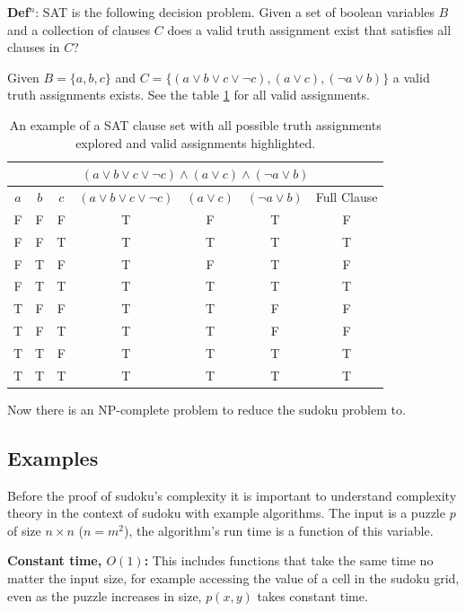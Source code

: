\documentclass[a4paper,11pt]{report}
\newcounter{row}
\newcounter{col}
\begin{document}
\textbf{Def$^n$}: SAT is the following decision problem. Given a set of boolean variables $B$ and a collection of clauses $C$ does a valid truth assignment exist that satisfies all clauses in $C$?

Given $B = \{a,b,c\}$ and  $C=\{(a\lor b \lor c \lor \neg c), (a \lor c), (\neg a\lor b)\}$ a valid truth assignments exists. See the table \ref{satex} for all valid assignments.

\begin{table}
\begin{center}
\begin{tabular}{ |c|c|c|c|c|c|c|  }
 \hline
 \multicolumn{7}{|c|}{$(a\lor b \lor c \lor \neg c)\land (a \lor c) \land (\neg a\lor b)$} \\
 \hline
$a$ & $b$ & $c$ & $(a\lor b \lor c \lor \neg c)$ & $(a \lor c)$ & $(\neg a\lor b)$ & Full Clause\\
 \hline
 F & F & F & T & F & T & F \\
\rowcolor{lightgray}
 F & F & T & T & T & T & T \\
 F & T & F & T & F & T & F \\
\rowcolor{lightgray}
 F & T & T & T & T & T & T \\
 T & F & F & T & T & F & F \\
 T & F & T & T & T & F & F \\
\rowcolor{lightgray}
 T & T & F & T & T & T & T \\
\rowcolor{lightgray}
 T & T & T & T & T & T & T \\
 \hline
\end{tabular}
\end{center}
\caption{\label{satex}An example of a SAT clause set with all possible truth assignments explored and valid assignments highlighted.}
\end{table}

Now there is an NP-complete problem to reduce the sudoku problem to.

\subsection{Examples}

Before the proof of sudoku's complexity it is important to understand complexity theory in the context of sudoku with example algorithms. The input is a puzzle $p$ of size $n\times n$ ($n=m^2$), the algorithm's run time is a function of this variable.

\textbf{Constant time, $O(1)$:} This includes functions that take the same time no matter the input size, for example accessing the value of a cell in the sudoku grid, even as the puzzle increases in size, $p(x,y)$ takes constant time.
\end{document}
